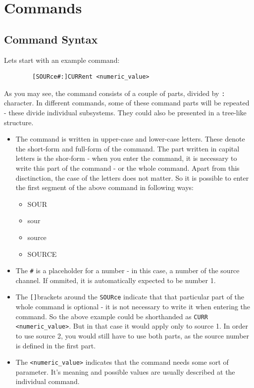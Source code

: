 \documentclass[a4paper,10pt]{article}
\begin{document}
\section{Commands}

\subsection{Command Syntax}
    Lets start with an example command:
    \begin{verbatim}
        [SOURce#:]CURRent <numeric_value>
    \end{verbatim}
    As you may see, the command consists of a couple of parts, divided by \verb|:| character. In different commands, some of these command parts will be repeated - these divide individual subsystems. They could also be presented in a tree-like structure.
    \begin{itemize}
        \item{} The command is written in upper-case and lower-case letters. These denote the short-form and full-form of the command. The part written in capital letters is the shor-form - when you enter the command, it is necessary to write this part of the command - or the whole command. Apart from this disctinction, the case of the letters does not matter. So it is possible to enter the first segment of the above command in following ways:
        \begin{itemize}
            \item{SOUR}
            \item{sour}
            \item{source}
            \item{SOURCE}
        \end{itemize}
        \item{} The \verb|#| is a placeholder for a number - in this case, a number of the source channel. If ommited, it is automatically expected to be number 1.
        \item{} The \verb|[]|brackets around the \verb|SOURce| indicate that that particular part of the whole command is optional - it is not necessary to write it when entering the command. So the above example could be shorthanded as \verb|CURR <numeric_value>|. But in that case it would apply only to source 1. In order to use source 2, you would still have to use both parts, as the source number is defined in the first part. 
        \item{} The \verb|<numeric_value>| indicates that the command needs some sort of parameter. It's meaning and possible values are usually described at the individual command.
    \end{itemize} 
\end{document}
